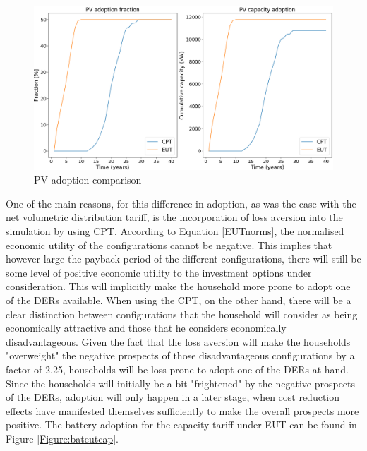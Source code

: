  \newline \noindent
 \begin{figure}[h!]
\centering
\includegraphics[width=14cm]{EUTCompar/Pvcap.png}
\caption{PV adoption comparison}
\label{Figure:PVcomparcap}
\end{figure}
\newline \newline \noindent
One of the main reasons, for this difference in adoption, as was the case with the net volumetric distribution tariff, is the incorporation of loss aversion into the simulation by using CPT. According to Equation \ref{EUTnorms}, the normalised economic utility of the configurations cannot be negative. This implies that however large the payback period of the different configurations, there will still be some level of positive economic utility to the investment options under consideration. This will implicitly make the household more prone to adopt one of the DERs available. When using the CPT, on the other hand, there will be a clear distinction between configurations that the household will consider as being economically attractive and those that he considers economically disadvantageous. Given the fact that the loss aversion will make the households "overweight" the negative prospects of those disadvantageous configurations by a factor of 2.25, households will be loss prone to adopt one of the DERs at hand. Since the households will initially be a bit "frightened" by the negative prospects of the DERs, adoption will only happen in a later stage, when cost reduction effects have manifested themselves sufficiently to make the overall prospects more positive. 
\newline \newline \noindent
The battery adoption for the capacity tariff under EUT can be found in Figure \ref{Figure:bateutcap}.
\newline
